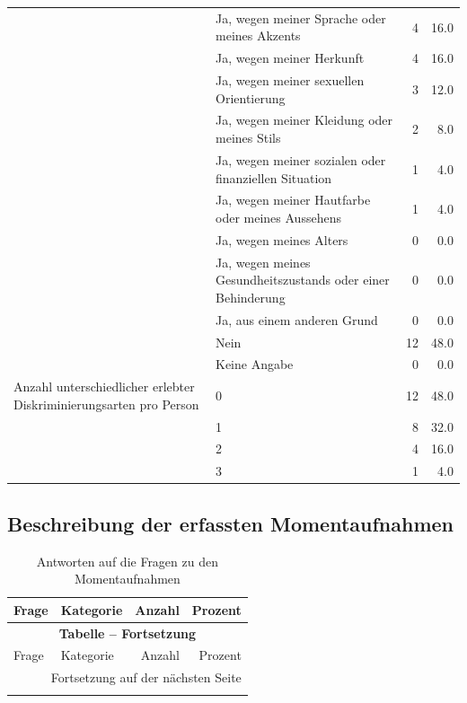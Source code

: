 \begin{appendices}
\begin{longtable}{p{5.5cm}p{5.5cm}rr}
     & Ja, wegen meiner Sprache oder meines Akzents & 4 & 16.0 \\*
     & Ja, wegen meiner Herkunft & 4 & 16.0 \\*
     & Ja, wegen meiner sexuellen Orientierung & 3 & 12.0 \\*
     & Ja, wegen meiner Kleidung oder meines Stils & 2 & 8.0 \\*
     & Ja, wegen meiner sozialen oder finanziellen Situation & 1 & 4.0 \\*
     & Ja, wegen meiner Hautfarbe oder meines Aussehens & 1 & 4.0 \\*
     & Ja, wegen meines Alters & 0 & 0.0 \\*
     & Ja, wegen meines Gesundheitszustands oder einer Behinderung & 0 & 0.0 \\*
     & Ja, aus einem anderen Grund & 0 & 0.0 \\*
     & Nein & 12 & 48.0 \\*
     & Keine Angabe & 0 & 0.0 \\
     \midrule
    \addlinespace
    Anzahl unterschiedlicher erlebter Diskriminierungsarten pro Person & 0 & 12 & 48.0 \\*
     & 1 & 8 & 32.0 \\*
     & 2 & 4 & 16.0 \\*
     & 3 & 1 & 4.0 \\
     \bottomrule
\end{longtable}

\clearpage
\subsection{Beschreibung der erfassten Momentaufnahmen}
\label{app:appendix_moments}

\begin{longtable}{p{5.5cm}p{5.5cm}rr}
    \caption{Antworten auf die Fragen zu den Momentaufnahmen}
    \label{tab:moments}\\
    \toprule
    Frage & Kategorie & Anzahl & Prozent \\
    \midrule
    \endfirsthead

    \multicolumn{4}{c}{{\bfseries Tabelle \thetable{} -- Fortsetzung}} \\
    \toprule
    Frage & Kategorie & Anzahl & Prozent \\
    \midrule
    \endhead
    
    \midrule
    \multicolumn{4}{r}{Fortsetzung auf der nächsten Seite}\\
    \endfoot
    

\end{longtable}
\end{appendices}
